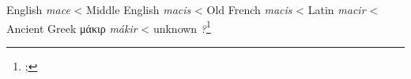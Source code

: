 \begin{etymology}\label{ety:mace}
English \textit{mace}
< Middle English \textit{macis}
< Old French \textit{macis}
< Latin \textit{macir}
< Ancient Greek {μάκιρ} \textit{mákir}
< unknown \textit{?}\footnote{; }
\end{etymology}